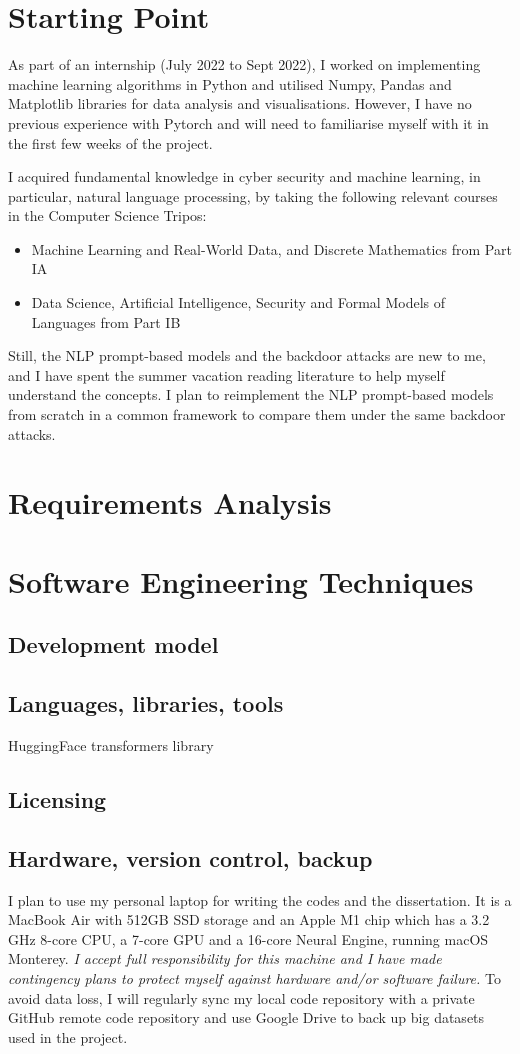 \section{Starting Point}
As part of an internship (July 2022 to Sept 2022), I worked on implementing machine learning algorithms in Python and utilised Numpy, Pandas and Matplotlib libraries for data analysis and visualisations. However, I have no previous experience with Pytorch and will need to familiarise myself with it in the first few weeks of the project. 

I acquired fundamental knowledge in cyber security and machine learning, in particular, natural language processing, by taking the following relevant courses in the Computer Science Tripos:
\begin{itemize}
    \item Machine Learning and Real-World Data, and Discrete Mathematics from Part IA
    \item Data Science, Artificial Intelligence, Security and Formal Models of Languages from Part IB
\end{itemize}

Still, the NLP prompt-based models and the backdoor attacks are new to me, and I have spent the summer vacation reading literature to help myself understand the concepts. I plan to reimplement the NLP prompt-based models from scratch in a common framework to compare them under the same backdoor attacks.

\section{Requirements Analysis}
\section{Software Engineering Techniques}
\subsection{Development model}
\subsection{Languages, libraries, tools}
HuggingFace transformers library \cite{Wolf19hugtransf}
\subsection{Licensing}
\subsection{Hardware, version control, backup}
I plan to use my personal laptop for writing the codes and the dissertation. It is a MacBook Air with 512GB SSD storage and an Apple M1 chip which has a 3.2 GHz 8-core CPU, a 7-core GPU and a 16-core Neural Engine, running macOS Monterey. \textit{I accept full responsibility for this machine and I have made contingency plans to protect myself against hardware and/or software failure.} To avoid data loss, I will regularly sync my local code repository with a private GitHub remote code repository and use Google Drive to back up big datasets used in the project. 

